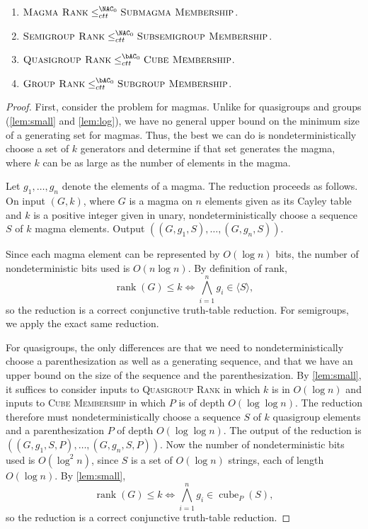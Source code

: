 \documentclass{article}
\newcommand{\gen}[1]{\langle #1 \rangle}
\DeclareMathOperator{\cube}{cube}
\DeclareMathOperator{\rank}{rank}
\begin{document}
\begin{lemma}\label{lem:ranktomem}
  \mbox{}
  \begin{enumerate}
  \item $\textsc{Magma Rank} \leq^{\NAC_0}_{ctt} \textsc{Submagma Membership}$.
  \item $\textsc{Semigroup Rank} \leq^{\NAC_0}_{ctt} \textsc{Subsemigroup Membership}$.
  \item $\textsc{Quasigroup Rank} \leq^{\bAC_0}_{ctt} \textsc{Cube Membership}$.
  \item $\textsc{Group Rank} \leq^{\bAC_0}_{ctt} \textsc{Subgroup Membership}$.
  \end{enumerate}
\end{lemma}
\begin{proof}
  First, consider the problem for magmas.
  Unlike for quasigroups and groups (\autoref{lem:small} and \autoref{lem:log}), we have no general upper bound on the minimum size of a generating set for magmas.
  Thus, the best we can do is nondeterministically choose a set of $k$ generators and determine if that set generates the magma, where $k$ can be as large as the number of elements in the magma.

  Let $g_1, \dotsc, g_n$ denote the elements of a magma.
  The reduction proceeds as follows.
  On input $(G, k)$, where $G$ is a magma on $n$ elements given as its Cayley table and $k$ is a positive integer given in unary, nondeterministically choose a sequence $S$ of $k$ magma elements.
  Output $((G, g_1, S), \dotsc, (G, g_n, S))$.

  Since each magma element can be represented by $O(\log n)$ bits, the number of nondeterministic bits used is $O(n \log n)$.
  By definition of rank,
  \begin{equation*}
    \rank(G) \leq k \iff \bigwedge_{i = 1}^n g_i \in \gen{S},
  \end{equation*}
  so the reduction is a correct conjunctive truth-table reduction.
  For semigroups, we apply the exact same reduction.

  For quasigroups, the only differences are that we need to nondeterministically choose a parenthesization as well as a generating sequence, and that we have an upper bound on the size of the sequence and the parenthesization.
  By \autoref{lem:small}, it suffices to consider inputs to \textsc{Quasigroup Rank} in which $k$ is in $O(\log n)$ and inputs to \textsc{Cube Membership} in which $P$ is of depth $O(\log \log n)$.
  The reduction therefore must nondeterministically choose a sequence $S$ of $k$ quasigroup elements and a parenthesization $P$ of depth $O(\log \log n)$.
  The output of the reduction is $((G, g_1, S, P), \dotsc, (G, g_n, S, P))$.
  Now the number of nondeterministic bits used is $O(\log^2 n)$, since $S$ is a set of $O(\log n)$ strings, each of length $O(\log n)$.
  By \autoref{lem:small},
  \begin{equation*}
    \rank(G) \leq k \iff \bigwedge_{i = 1}^n g_i \in \cube_P(S),
  \end{equation*}
  so the reduction is a correct conjunctive truth-table reduction.


\end{proof}
\end{document}
